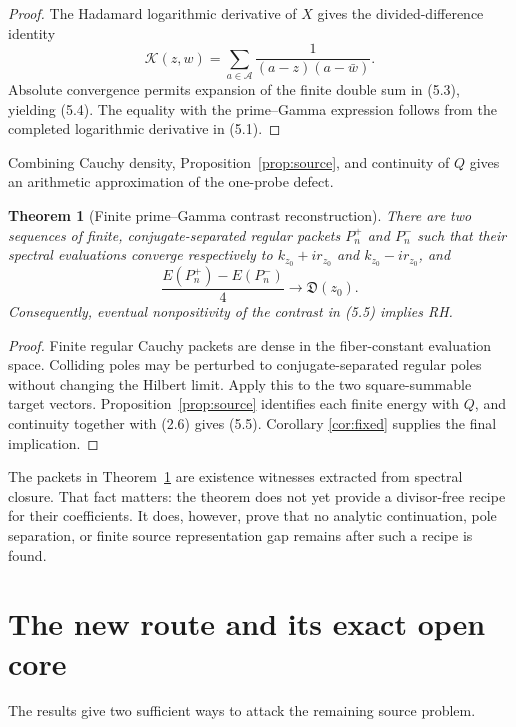 \documentclass[11pt]{article}
\newtheorem{theorem}{Theorem}[section]
\theoremstyle{definition}
\theoremstyle{remark}
\newcommand{\cA}{\mathcal A}
\newcommand{\cK}{\mathcal K}
\begin{document}
\begin{proof}
The Hadamard logarithmic derivative of $X$ gives the divided-difference identity
\[
 \cK(z,w)=\sum_{a\in\cA}\frac{1}{(a-z)(a-\bar w)}.
\]
Absolute convergence permits expansion of the finite double sum in (5.3), yielding (5.4).
The equality with the prime--Gamma expression follows from the completed logarithmic derivative
in (5.1).
\end{proof}

Combining Cauchy density, Proposition~\ref{prop:source}, and continuity of $Q$ gives an arithmetic
approximation of the one-probe defect.

\begin{theorem}[Finite prime--Gamma contrast reconstruction]
\label{thm:reconstruction}
There are two sequences of finite, conjugate-separated regular packets $P_n^+$ and $P_n^-$ such
that their spectral evaluations converge respectively to $k_{z_0}+ir_{z_0}$ and
$k_{z_0}-ir_{z_0}$, and
\begin{equation}
 \frac{E(P_n^+)-E(P_n^-)}4\longrightarrow\mathfrak D(z_0). \tag{5.5}
\end{equation}
Consequently, eventual nonpositivity of the contrast in (5.5) implies RH.
\end{theorem}

\begin{proof}
Finite regular Cauchy packets are dense in the fiber-constant evaluation space.  Colliding poles
may be perturbed to conjugate-separated regular poles without changing the Hilbert limit.
Apply this to the two square-summable target vectors.  Proposition~\ref{prop:source} identifies
each finite energy with $Q$, and continuity together with (2.6) gives (5.5).  Corollary
\ref{cor:fixed} supplies the final implication.
\end{proof}

The packets in Theorem~\ref{thm:reconstruction} are existence witnesses extracted from spectral
closure.  That fact matters: the theorem does not yet provide a divisor-free recipe for their
coefficients.  It does, however, prove that no analytic continuation, pole separation, or finite
source representation gap remains after such a recipe is found.

\section{The new route and its exact open core}

The results give two sufficient ways to attack the remaining source problem.
\end{document}
